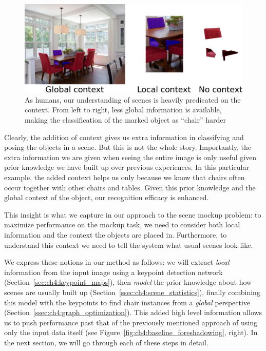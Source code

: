 \documentclass[10pt,twocolumn,letterpaper]{article}
\begin{document}
\begin{figure}
    \includegraphics[width=\linewidth]{figures/context_example/context_example}
    \caption[Decreasing context]{As humans, our understanding of scenes is heavily predicated on
    the context. From left to right, less global information is available,
making the classification of the marked object as ``chair'' harder}
    \label{fig:ch4:context_example}
\end{figure}

Clearly, the addition of context gives us extra information in classifying and
posing the objects in a scene.  But this is not the whole story. Importantly,
the extra information we are given when seeing the entire image is only useful
given prior knowledge we have built up over previous experiences.  In this
particular example, the added context helps us only because we know that chairs
often occur together with other chairs and tables.  Given this prior knowledge
and the global context of the object, our recognition efficacy is enhanced.

This insight is what we capture in our approach to the scene mockup problem: to
maximize performance on the mockup task, we need to consider both local
information and the context the objects are placed in. Furthermore, to
understand this context we need to tell the system what usual scenes look like.

We express these notions in our method as follows: we will extract \emph{local}
information from the input image using a keypoint detection network
(Section~\ref{sec:ch4:keypoint_maps}), then \emph{model} the prior knowledge
about how scenes are usually built up (Section~\ref{ssec:ch4:scene_statistics}),
finally combining this model with the keypoints to find chair instances from a
\emph{global} perspective (Section~\ref{ssec:ch4:graph_optimization}).  This
added high level information allows us to push performance past that of the
previously mentioned approach of using only the input data itself (see
Figure~\ref{fig:ch4:baseline_foreshadowing}, right).  In the next section, we
will go through each of these steps in detail.
\end{document}
